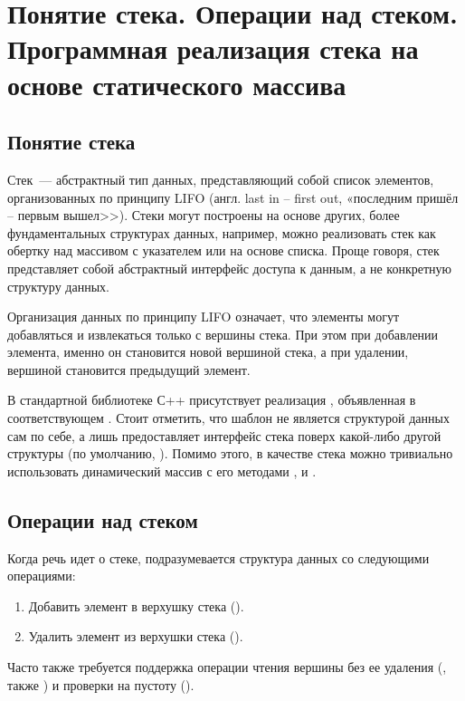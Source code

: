 \section{Понятие стека. Операции над стеком. Программная реализация стека на основе статического массива}
\subsection{Понятие стека}
Стек~--- абстрактный тип данных, представляющий собой список элементов, организованных по принципу
LIFO (англ. last in -- first out, «последним пришёл -- первым вышел>>). Стеки могут построены на основе других, более фундаментальных
структурах данных, например, можно реализовать стек как обертку над массивом с указателем или на основе списка. Проще говоря, стек представляет
собой абстрактный интерфейс доступа к данным, а не конкретную структуру данных.

Организация данных по принципу LIFO означает, что элементы могут добавляться и извлекаться только с вершины стека. При этом при добавлении
элемента, именно он становится новой вершиной стека, а при удалении, вершиной становится предыдущий элемент.

В стандартной библиотеке С++ присутствует реализация , объявленная в соответствующем
. Стоит отметить, что шаблон  не является
структурой данных сам по себе, а лишь предоставляет интерфейс стека поверх какой-либо другой структуры (по умолчанию, ).
Помимо этого, в качестве стека можно тривиально использовать динамический массив  с его
методами ,  и .

\subsection{Операции над стеком}
Когда речь идет о стеке, подразумевается структура данных со следующими операциями:
\begin{enumerate}
    \item Добавить элемент в верхушку стека ().
    \item Удалить элемент из верхушки стека ().
\end{enumerate}

Часто также требуется поддержка операции чтения вершины без ее удаления (, также ) и
проверки на пустоту ().


